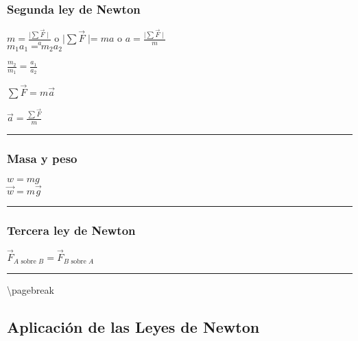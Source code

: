 \documentclass[
]{article}
\begin{document}
\hypertarget{segunda-ley-de-newton}{%
\subsubsection{Segunda ley de Newton}\label{segunda-ley-de-newton}}

{\(m = \frac{\mid \sum\overset{\rightarrow}{F} \mid}{a}\)} o
{\(\mid \sum\overset{\rightarrow}{F}\operatorname{\mid=}ma\)} o
{\(a = \frac{\mid \sum\overset{\rightarrow}{F} \mid}{m}\)}\\
{\(m_{1}a_{1} = m_{2}a_{2}\)}

{\(\frac{m_{2}}{m_{1}} = \frac{a_{1}}{a_{2}}\)}

{\(\sum\overset{\rightarrow}{F} = m\overset{\rightarrow}{a}\)}

{\(\overset{\rightarrow}{a} = \frac{\sum\overset{\rightarrow}{F}}{m}\)}

\begin{center}\rule{0.5\linewidth}{0.5pt}\end{center}

\hypertarget{masa-y-peso}{%
\subsubsection{Masa y peso}\label{masa-y-peso}}

{\(w = mg\)}\\
{\(\overset{\rightarrow}{w} = m\overset{\rightarrow}{g}\)}

\begin{center}\rule{0.5\linewidth}{0.5pt}\end{center}

\hypertarget{tercera-ley-de-newton}{%
\subsubsection{Tercera ley de Newton}\label{tercera-ley-de-newton}}

{\({\overset{\rightarrow}{F}}_{A\text{~sobre~}B} = {\overset{\rightarrow}{F}}_{B\text{~sobre~}A}\)}

\begin{center}\rule{0.5\linewidth}{0.5pt}\end{center}

\textbackslash pagebreak

\hypertarget{aplicaciuxf3n-de-las-leyes-de-newton}{%
\subsection{Aplicación de las Leyes de
Newton}\label{aplicaciuxf3n-de-las-leyes-de-newton}}
\end{document}
